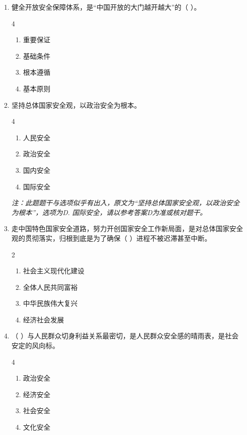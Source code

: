 \documentclass[a4paper,11pt]{ctexart}
\begin{document}
\begin{enumerate}
    \item 健全开放安全保障体系，是“中国开放的大门越开越大”的（ ）。
    \begin{multicols}{4}
    \begin{enumerate}
        \item 重要保证
        \item 基础条件
        \item 根本遵循
        \item 基本原则
    \end{enumerate}
    \end{multicols}

    \item 坚持总体国家安全观，以政治安全为根本。
    \begin{multicols}{4}
    \begin{enumerate}
        \item 人民安全
        \item 政治安全
        \item 国内安全
        \item 国际安全
    \end{enumerate}
    \end{multicols}
    \textit{注：此题题干与选项似乎有出入，原文为“坚持总体国家安全观，以政治安全为根本”，选项为D. 国际安全，请以参考答案D为准或核对题干。}

    \item 走中国特色国家安全道路，努力开创国家安全工作新局面，是对总体国家安全观的贯彻落实，归根到底是为了确保（ ）进程不被迟滞甚至中断。
    \begin{multicols}{2}
    \begin{enumerate}
        \item 社会主义现代化建设
        \item 全体人民共同富裕
        \item 中华民族伟大复兴
        \item 经济社会发展
    \end{enumerate}
    \end{multicols}

    \item （ ）与人民群众切身利益关系最密切，是人民群众安全感的晴雨表，是社会安定的风向标。
    \begin{multicols}{4}
    \begin{enumerate}
        \item 政治安全
        \item 经济安全
        \item 社会安全
        \item 文化安全
    \end{enumerate}
    \end{multicols}


\end{enumerate}
\end{document}
